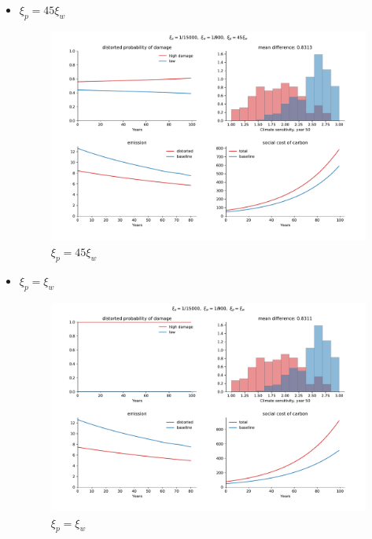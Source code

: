 \documentclass{article}
\begin{document}
\begin{itemize}
\begin{figure}[H]
            \label{fig:notebook/15_900_90}
        \end{figure}
        \newpage
    \item \(\xi_p=45\xi_w\)
        \begin{figure}[H]
            \centering
            \includegraphics[width=\linewidth]{notebook/15_900_45.pdf}
            \caption{\(\xi_p=45\xi_w\)}
            \label{fig:notebook/15_900_45}
        \end{figure}
        \newpage
    \item \(\xi_p=\xi_w\)
        \begin{figure}[H]
            \centering
            \includegraphics[width=\linewidth]{notebook/15_900_1.pdf}
            \caption{\(\xi_p=\xi_w\)}
            \label{fig:notebook/15_900_45}
        \end{figure}
\end{itemize}
\newpage
\end{document}
